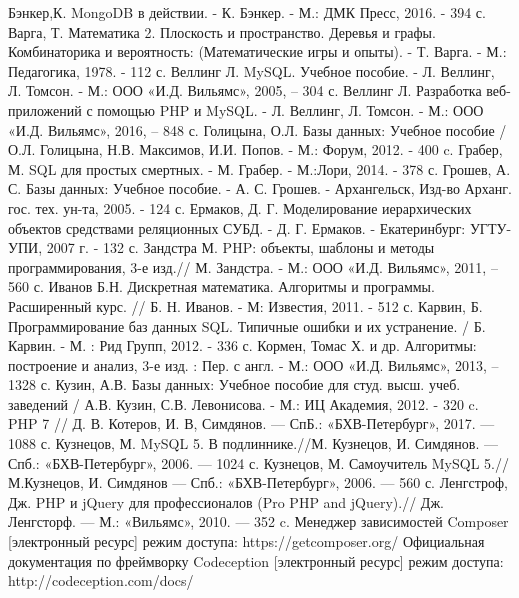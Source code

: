 \documentclass[a4paper,14pt]{extreport}
\theoremstyle{definition}
\begin{document}
\begin{thebibliography}{99}
 Бэнкер,К. MongoDB в действии. - К. Бэнкер. - М.: ДМК Пресс, 2016. - 394 с.
 Варга, Т. Математика 2. Плоскость и пространство. Деревья и графы. Комбинаторика и вероятность: (Математические игры и опыты). - Т. Варга. - М.: Педагогика, 1978. - 112 с.
 Веллинг Л. MySQL. Учебное пособие. - Л. Веллинг, Л. Томсон. - М.: ООО «И.Д. Вильямс», 2005, – 304 с.
 Веллинг Л. Разработка веб-приложений с помощью PHP и MySQL. - Л. Веллинг, Л. Томсон. - М.: ООО «И.Д. Вильямс», 2016, – 848 с.
 Голицына, О.Л. Базы данных: Учебное пособие / О.Л. Голицына, Н.В. Максимов, И.И. Попов. - М.: Форум, 2012. - 400 c.
 Грабер, М. SQL для простых смертных. - М. Грабер. -  М.:Лори, 2014. - 378 с.
 Грошев, А. С. Базы данных: Учебное пособие. - А. С. Грошев. - Архангельск, Изд-во Арханг. гос. тех. ун-та, 2005. - 124 с.
 Ермаков, Д. Г. Моделирование иерархических объектов средствами реляционных СУБД. - Д. Г. Ермаков. - Екатеринбург: УГТУ-УПИ, 2007 г. - 132 с.
 Зандстра М. PHP: объекты, шаблоны и методы программирования, 3-е изд.// М. Зандстра. - М.: ООО «И.Д. Вильямс», 2011, – 560 с.
 Иванов Б.Н. Дискретная математика. Алгоритмы и программы. Расширенный курс. // Б. Н. Иванов. - М: Известия, 2011. - 512 с.
 Карвин, Б.  Программирование баз данных SQL. Типичные ошибки и их устранение. / Б. Карвин. - М. : Рид Групп, 2012. - 336 с.
 Кормен, Томас Х. и др. Алгоритмы: построение и анализ, 3-е изд. : Пер. с англ. - М.: ООО «И.Д. Вильямс», 2013, – 1328 с.
 Кузин, А.В. Базы данных: Учебное пособие для студ. высш. учеб. заведений / А.В. Кузин, С.В. Левонисова. - М.: ИЦ Академия, 2012. - 320 c.
 PHP 7 // Д. В. Котеров, И. В, Симдянов. — СпБ.: «БХВ-Петербург», 2017. — 1088 с.
 Кузнецов, М. MySQL 5. В подлиннике.//М. Кузнецов, И. Симдянов. — Спб.: «БХВ-Петербург», 2006. — 1024 с.
 Кузнецов, М. Самоучитель MySQL 5.//М.Кузнецов, И. Симдянов — Спб.: «БХВ-Петербург», 2006. — 560 с.
 Ленгстроф, Дж. PHP и jQuery для профессионалов (Pro PHP and jQuery).// Дж. Ленгсторф. — М.: «Вильямс», 2010. — 352 c.
 Менеджер зависимостей Composer [электронный ресурс] режим доступа: https://getcomposer.org/
 Официальная документация по фреймворку Codeception  [электронный ресурс] режим доступа: http://codeception.com/docs/

\end{thebibliography}
\end{document}
